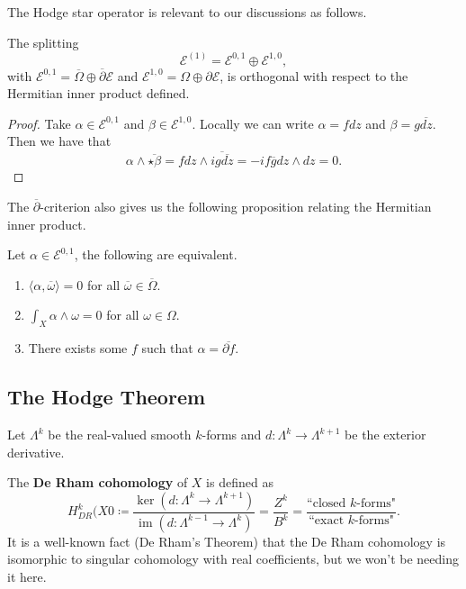 \documentclass{article}
\begin{document}
{The Hodge star operator is relevant to our discussions as follows. 
\begin{proposition}
    The splitting 
    \[\mathcal{E}^{(1)} = \mathcal{E}^{0, 1} \oplus \mathcal{E}^{1, 0},\]
with $\mathcal{E}^{0, 1} = \overline{\Omega} \oplus \overline{\partial} \mathcal{E}$ and $\mathcal{E}^{1, 0} = \Omega \oplus \partial \mathcal{E}$, is orthogonal with respect to the Hermitian inner product defined.
\end{proposition}

\begin{proof}
Take $\alpha \in \mathcal{E}^{0, 1}$ and $\beta \in \mathcal{E}^{1, 0}$. Locally we can write $\alpha = fdz$ and $\beta = g \overline{dz}$. Then we have that
\[\alpha \wedge \overline{\star \beta} = f dz \wedge \overline{i g \overline{dz}} = - i f \overline{g} dz \wedge dz = 0.\]
\end{proof}

The $\overline{\partial}$-criterion also gives us the following proposition relating the Hermitian inner product.
\begin{proposition}
    Let $\alpha \in \mathcal{E}^{0, 1}$, the following are equivalent.
    \begin{enumerate}
        \item $\langle \alpha, \overline{\omega} \rangle = 0$ for all $\overline{\omega} \in \overline{\Omega}$.
        \item $\int_X \alpha \wedge \omega = 0$ for all $\omega \in \Omega$.
        \item There exists some $f$ such that $\alpha = \overline{\partial f}$.\\
    \end{enumerate}
\end{proposition}

\subsection{The Hodge Theorem}

Let $\Lambda^k$ be the real-valued smooth $k$-forms and $d: \Lambda^k \to \Lambda^{k+1}$ be the exterior derivative.
\begin{definition}
    The \textbf{De Rham cohomology} of $X$ is defined as
    \[H^k_{DR}(X0 \coloneqq \frac{\ker(d: \Lambda^k \to \Lambda^{k+1})}{\operatorname{im}(d: \Lambda^{k-1} \to \Lambda^k)} = \frac{Z^k}{B^k} = \frac{\text{``closed $k$-forms"}}{\text{``exact $k$-forms"}}.\]
    It is a well-known fact (De Rham's Theorem) that the De Rham cohomology is isomorphic to singular cohomology with real coefficients, but we won't be needing it here.
\end{definition}

}
\end{document}
